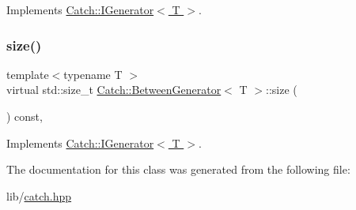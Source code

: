 Implements \hyperlink{struct_catch_1_1_i_generator_ad69e937cb66dba3ed9429c42abf4fce3}{Catch\+::\+I\+Generator$<$ T $>$}.

\hypertarget{class_catch_1_1_between_generator_af65a1fe51f9b1106fc676e3dd189adb6}{}\label{class_catch_1_1_between_generator_af65a1fe51f9b1106fc676e3dd189adb6} 
\subsubsection{\texorpdfstring{size()}{size()}}
{\footnotesize\ttfamily template$<$typename T $>$ \\
virtual std\+::size\+\_\+t \hyperlink{class_catch_1_1_between_generator}{Catch\+::\+Between\+Generator}$<$ T $>$\+::size (\begin{DoxyParamCaption}{ }\end{DoxyParamCaption}) const\hspace{0.3cm}{\ttfamily [inline]}, {\ttfamily [virtual]}}



Implements \hyperlink{struct_catch_1_1_i_generator_a2e317253b03e838b6065ce69719a198e}{Catch\+::\+I\+Generator$<$ T $>$}.



The documentation for this class was generated from the following file\+:\begin{DoxyCompactItemize}
\item 
lib/\hyperlink{catch_8hpp}{catch.\+hpp}\end{DoxyCompactItemize}

